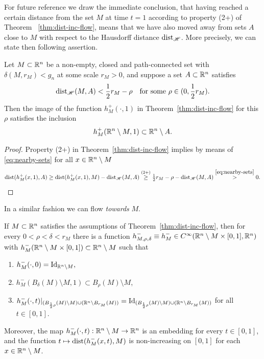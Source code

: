 For future reference we draw the immediate conclusion, that having reached 
a certain
distance
from the set $M$ at time $t=1$ according to property (2+) of Theorem~
\ref{thm:dist-inc-flow}, means that we have also moved away from sets $A$
close to $M$
with respect to the Hausdorff distance $\operatorname{dist}_{\mathscr{H}}$.
More precisely, we can state then following assertion.
\begin{corollary}\label{cor:nearby-sets}
Let $M\subset\mathbb{R}^n$ be a non-empty, closed and path-connected set with
$\delta(M,r_M)<g_n$ at some scale $r_M>0$, and suppose a set $A\subset\mathbb{R}^n$ 
satisfies
\begin{equation}\label{eq:nearby-sets}
\operatorname{dist}_{\mathscr{H}}(M,A)<\frac12{r_M} -\rho\quad\textnormal{for some $\rho\in (0,
\frac12{r_M}).$}
\end{equation}
Then the image of the function $h_M^+(\cdot,1)$ 
in Theorem~\ref{thm:dist-inc-flow} for this
$\rho$ satisfies the inclusion
\begin{equation}\label{eq:nearby-complements}
h_M^+(\mathbb{R}^n\setminus M,1)\subset\mathbb{R}^n\setminus A.
\end{equation}
\end{corollary}
\begin{proof}
Property (2+) in Theorem~\ref{thm:dist-inc-flow} implies by means of 
\eqref{eq:nearby-sets} for all $x\in\mathbb{R}^n\setminus M$
\[
\textstyle
\operatorname{dist}(h_M^+(x,1),A)\ge\operatorname{dist}(h_M^+(x,1),M)-\operatorname{dist}_{\mathscr{H}}(M,A)\overset{\textnormal{(2+)}}{
\ge}\frac12{r_M} -\rho-\operatorname{dist}_{\mathscr{H}}(M,A)\overset{\eqref{eq:nearby-sets}}{>} 0.\qedhere
\]
\end{proof}
In a similar fashion we can flow \emph{towards} $M$.
\begin{theorem}\label{thm:dist-dec-flow}
If $M\subset\mathbb{R}^n$ satisfies the assumptions of Theorem~\ref{thm:dist-inc-flow},
then for every $0<\rho <\delta < r_M$ there is a function $h_{M,\rho,\delta}^-
\equiv h_M^-\in C^\infty (\mathbb{R}^n\setminus M\times [0,1],\mathbb{R}^n)$ with 
$h_M^-(\mathbb{R}^n\setminus M\times [0,1])\subset\mathbb{R}^n\setminus M$ such that
\begin{enumerate}
\item[\rm (1-)] $h_M^-(\cdot,0)={{\rm Id}}_{\mathbb{R}^n\setminus M},$
\item[\rm (2-)] $h_M^-(B_\delta(M)\setminus M,1)\subset B_{\rho}(M)\setminus M$,
\item[\rm (3-)] $h_M^-(\cdot,t)|_{(B_{\frac12{\rho}}(M)\setminus M)\cup(\mathbb{R}^n\setminus B_{r_M}(M))}=
{{\rm Id}}_{(B_{\frac12{\rho}}(M)\setminus M)\cup(\mathbb{R}^n\setminus B_{r_M}(M))}$
 for all $t\in [0,1]$.
\end{enumerate}
Moreover, the map $h_M^-(\cdot,t):\mathbb{R}^n\setminus M\to\mathbb{R}^n$ is an
embedding for every $t\in [0,1]$, and the function $t\mapsto\operatorname{dist}(h_M^-(x,t),M)$
is non-increasing on $[0,1]$ for each $x\in\mathbb{R}^n\setminus M$.
\end{theorem}
